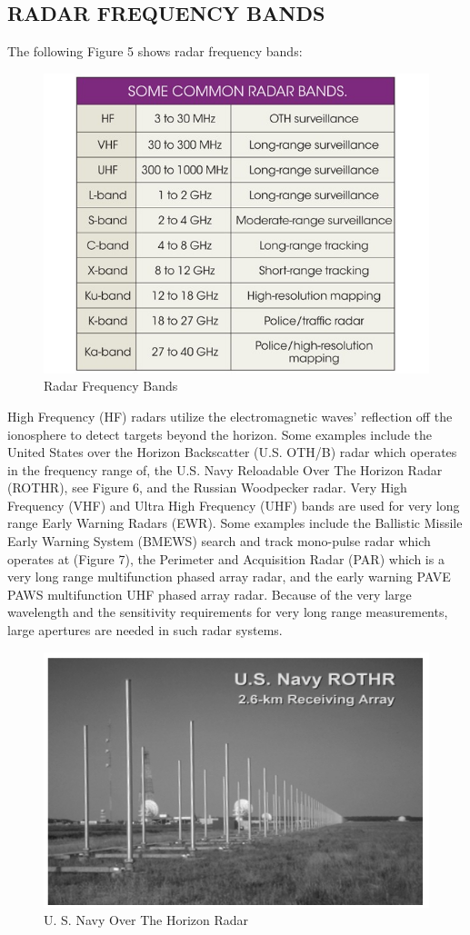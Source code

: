 \documentclass[14pt]{article} %
\begin{document}
\subsection{RADAR FREQUENCY BANDS}
\noindent The following Figure 5 shows radar frequency bands:
\begin{figure}[H]
\centering
\includegraphics[width=0.8\linewidth]{band.jpg}
  \caption{Radar Frequency Bands}
  \label{fig:figure 5}
\end{figure}
High Frequency (HF) radars utilize the electromagnetic waves’ reflection off the ionosphere to detect targets beyond the horizon. Some examples include the United States over the Horizon Backscatter (U.S. OTH/B) radar which operates in the frequency range of, the U.S. Navy Reloadable Over The Horizon Radar (ROTHR), see Figure 6, and the Russian Woodpecker radar. Very High Frequency (VHF) and Ultra High Frequency (UHF) bands are used for very long range Early Warning Radars (EWR). Some examples include the Ballistic Missile Early Warning System (BMEWS) search and track mono-pulse radar which operates at (Figure 7), the Perimeter and Acquisition Radar (PAR) which is a very long range multifunction phased
array radar, and the early warning PAVE PAWS multifunction UHF phased array radar. Because of the very large wavelength and the sensitivity requirements for very long range measurements, large apertures are needed in such radar systems.
 \begin{figure}[H]
  \includegraphics[width=\linewidth]{Horizonradar.png}
  \caption{U. S. Navy Over The Horizon Radar}
  \label{fig:figure 6}
\end{figure}
\end{document}
